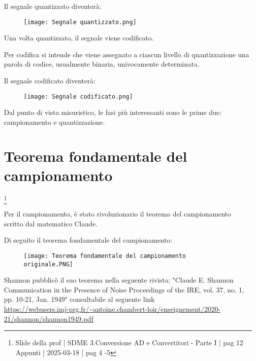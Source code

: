 Il segnale quantizzato diventerà: 

\begin{figure}[h]
    \centering
    \texttt{[image: Segnale quantizzato.png]}
\end{figure}

Una volta quantizzato, il segnale viene codificato. \newline 

Per codifica si intende che viene assegnato a ciascun livello di quantizzazione una parola di codice, 
usualmente binaria, univocamente determinata. \newline 

Il segnale codificato diventerà: 

\begin{figure}[h]
    \centering
    \texttt{[image: Segnale codificato.png]}
\end{figure}

\newpage 

Dal punto di vista misuristico, le fasi più interessanti sono le prime due: campionamento e quantizzazione. \newline 

\newpage 

\section{Teorema fondamentale del campionamento}
\footnote{Slide della prof | SDME 3.Conversione AD e Convertitori - Parte I | pag 12 \\  
Appunti | 2025-03-18 | pag 4 -5}

Per il campionamento, è stato rivoluzionario il teorema del campionamento scritto dal matematico 
Claude. \newline 

Di seguito il teorema fondamentale del campionamento: 

\begin{figure}[h]
    \centering
    \texttt{[image: Teorema fondamentale del campionamento originale.PNG]}
\end{figure}

\begin{tcolorbox}
    Shannon pubblicò il suo teorema nella seguente rivista: 
    "Claude E. Shannon Communication in the Presence of Noise
Proceedings of the IRE, vol. 37, no. 1, pp. 10-21, Jan. 1949" 
consultabile al seguente link \\ \url{https://webusers.imj-prg.fr/~antoine.chambert-loir/enseignement/2020-21/shannon/shannon1949.pdf}
\end{tcolorbox}

